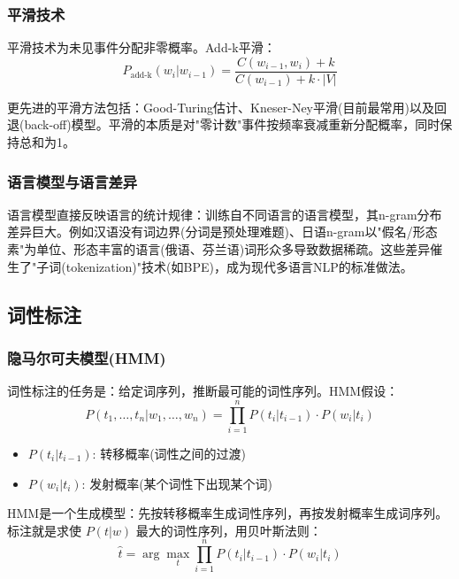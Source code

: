 \subsubsection{平滑技术}

平滑技术为未见事件分配非零概率。Add-k平滑：
\begin{equation}
    P_{\text{add-k}}(w_i | w_{i-1}) = \frac{C(w_{i-1}, w_i) + k}{C(w_{i-1}) + k \cdot |V|}
\end{equation}

更先进的平滑方法包括：Good-Turing估计、Kneser-Ney平滑(目前最常用)以及回退(back-off)模型。平滑的本质是对"零计数"事件按频率衰减重新分配概率，同时保持总和为1。

\subsubsection{语言模型与语言差异}

语言模型直接反映语言的统计规律：训练自不同语言的语言模型，其n-gram分布差异巨大。例如汉语没有词边界(分词是预处理难题)、日语n-gram以"假名/形态素"为单位、形态丰富的语言(俄语、芬兰语)词形众多导致数据稀疏。这些差异催生了"子词(tokenization)"技术(如BPE)，成为现代多语言NLP的标准做法。

\subsection{词性标注}

\subsubsection{隐马尔可夫模型(HMM)}

词性标注的任务是：给定词序列，推断最可能的词性序列。HMM假设：
\begin{equation}
    P(t_1, \ldots, t_n | w_1, \ldots, w_n) = \prod_{i=1}^{n} P(t_i | t_{i-1}) \cdot P(w_i | t_i)
\end{equation}

\begin{itemize}
    \item $P(t_i | t_{i-1})$: 转移概率(词性之间的过渡)
    \item $P(w_i | t_i)$: 发射概率(某个词性下出现某个词)
\end{itemize}

HMM是一个生成模型：先按转移概率生成词性序列，再按发射概率生成词序列。标注就是求使 $P(t | w)$ 最大的词性序列，用贝叶斯法则：
\begin{equation}
    \hat{t} = \arg\max_t \prod_{i=1}^{n} P(t_i | t_{i-1}) \cdot P(w_i | t_i)
\end{equation}

